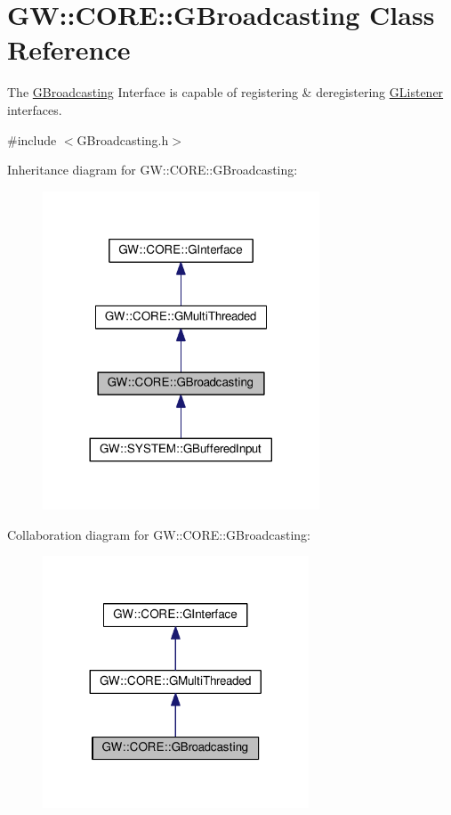 \hypertarget{classGW_1_1CORE_1_1GBroadcasting}{}\section{GW\+:\+:C\+O\+RE\+:\+:G\+Broadcasting Class Reference}
\label{classGW_1_1CORE_1_1GBroadcasting}


The \hyperlink{classGW_1_1CORE_1_1GBroadcasting}{G\+Broadcasting} Interface is capable of registering \& deregistering \hyperlink{classGW_1_1CORE_1_1GListener}{G\+Listener} interfaces.  




{\ttfamily \#include $<$G\+Broadcasting.\+h$>$}



Inheritance diagram for GW\+:\+:C\+O\+RE\+:\+:G\+Broadcasting\+:\nopagebreak
\begin{figure}[H]
\begin{center}
\leavevmode
\includegraphics[width=233pt]{classGW_1_1CORE_1_1GBroadcasting__inherit__graph}
\end{center}
\end{figure}


Collaboration diagram for GW\+:\+:C\+O\+RE\+:\+:G\+Broadcasting\+:\nopagebreak
\begin{figure}[H]
\begin{center}
\leavevmode
\includegraphics[width=224pt]{classGW_1_1CORE_1_1GBroadcasting__coll__graph}
\end{center}
\end{figure}
